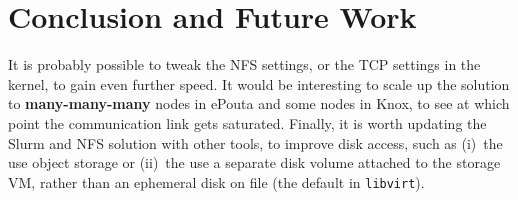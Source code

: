 \section{Conclusion and Future Work}
\label{section:conclusion}
%
It is probably possible to tweak the NFS settings, or the TCP settings
in the kernel, to gain even further speed.
%
It would be interesting to scale up the solution to
\textbf{many-many-many} nodes in ePouta and some nodes in Knox, to see
at which point the communication link gets saturated.
%
Finally, it is worth updating the Slurm and NFS solution with other
tools, to improve disk access, such as (i)~the use object storage or
(ii)~the use a separate disk volume attached to the storage VM, rather
than an ephemeral disk on file (\ie the default in \texttt{libvirt}).

